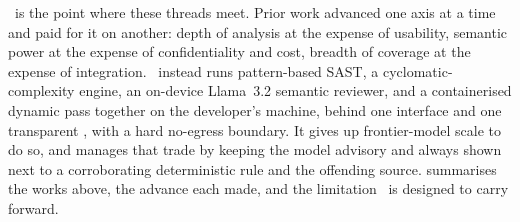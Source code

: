 \cs\ is the point where these threads meet. Prior work advanced one axis
at a time and paid for it on another: depth of analysis at the expense of
usability, semantic power at the expense of confidentiality and cost,
breadth of coverage at the expense of integration. \cs\ instead runs
pattern-based SAST, a cyclomatic-complexity engine, an on-device
\mbox{Llama~3.2} semantic reviewer, and a containerised dynamic pass
together on the developer's machine, behind one interface and one
transparent \phindex, with a hard no-egress boundary. It gives up
frontier-model scale to do so, and manages that trade by keeping the
model advisory and always shown next to a corroborating deterministic
rule and the offending source.  summarises the works
above, the advance each made, and the limitation \cs\ is designed to
carry forward.


